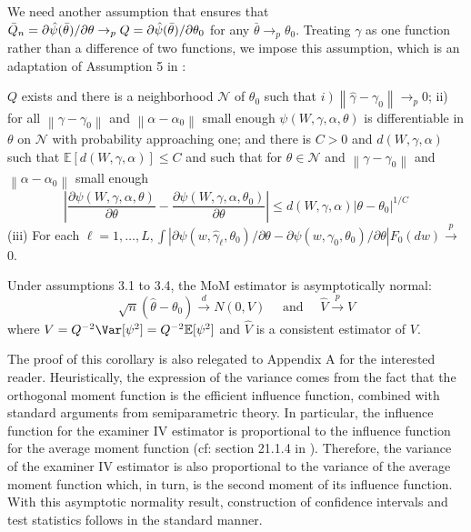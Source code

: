 We need another assumption that ensures that $\Bar{Q}_n=\partial \hat{\psi}(\bar{\theta}) / \partial \theta \rightarrow_p Q=\partial \hat{\psi}(\bar{\theta}) / \partial \theta_0$ for any $\bar{\theta} \rightarrow_p \theta_0$. Treating $\gamma$ as one function rather than a difference of two functions, we impose this assumption, which is an adaptation of Assumption 5 in \citet{chernozhukov2022locally}:
\begin{assumption}
   $Q$ exists and there is a neighborhood $\mathcal{N}$ of $\theta_0$ such that $\left.i\right)\left\|\hat{\gamma}-\gamma_0\right\| \rightarrow_p 0$; ii) for all $\left\|\gamma-\gamma_0\right\|$ and $\left\|\alpha-\alpha_0\right\|$ small enough $\psi\left(W, \gamma, \alpha, \theta\right)$ is differentiable in $\theta$ on $\mathcal{N}$ with probability approaching one; and there is $C>0$ and $d\left(W, \gamma, \alpha\right)$ such that $\mathbb{E}\left[d\left(W, \gamma, \alpha\right)\right] \leq C$ and such that for $\theta \in \mathcal{N}$ and $\left\|\gamma-\gamma_0\right\|$ and $\left\|\alpha-\alpha_0\right\|$ small enough
$$
\left|\frac{\partial \psi\left(W, \gamma, \alpha, \theta\right)}{\partial \theta}-\frac{\partial \psi\left(W, \gamma, \alpha, \theta_0\right)}{\partial \theta}\right| \leq d\left(W, \gamma, \alpha\right)\left|\theta-\theta_0\right|^{1 / C}$$
(iii) For each $\ell=1, \ldots, L, \int\left|\partial \psi\left(w, \hat{\gamma}_{\ell}, \theta_0\right) / \partial \theta-\partial \psi\left(w, \gamma_0, \theta_0\right) / \partial \theta\right| F_0(d w) \xrightarrow{p}$ 0.
\end{assumption}

\begin{corollary} \label{coro}
Under assumptions 3.1 to 3.4, the MoM estimator is asymptotically normal: 
$$
\sqrt{n}\left(\hat{\theta}-\theta_0\right) \xrightarrow{d} N(0, V) \quad \text { and } \quad \hat{V} \xrightarrow{p} V
$$
where $V=Q^{-2}\Var[\psi^2]=Q^{-2}\mathbb{E}[\psi^2]$ and $\hat{V}$ is a consistent estimator of $V$.
\end{corollary}

The proof of this corollary is also relegated to Appendix A for the interested reader. Heuristically, the expression of the variance comes from the fact that the orthogonal moment function is the efficient influence function, combined with standard arguments from semiparametric theory. In particular, the influence function for the examiner IV estimator is proportional to the influence function for the average moment function (cf: section 21.1.4 in \citet{kosorok2008introduction}). Therefore, the variance of the examiner IV estimator is also proportional to the variance of the average moment function which, in turn, is the second moment of its influence function. With this asymptotic normality result, construction of confidence intervals and test statistics follows in the standard manner.

